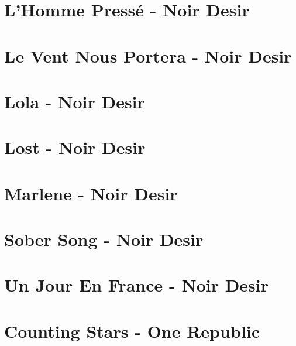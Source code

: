 \documentclass[11pt]{article}
\begin{document}
\section{L'Homme Pressé - Noir Desir}
\begin{guitar}

\end{guitar}

\section{Le Vent Nous Portera - Noir Desir}
\begin{guitar}

\end{guitar}


\section*{Lola - Noir Desir}
\begin{guitar}

\end{guitar}




\section{Lost - Noir Desir}


\section{Marlene - Noir Desir}
\begin{guitar}

\end{guitar}

\section{Sober Song - Noir Desir}



\section*{Un Jour En France - Noir Desir}
\begin{guitar}

\end{guitar}

\section{Counting Stars - One Republic}
\begin{guitar}

\end{guitar}
\end{document}
